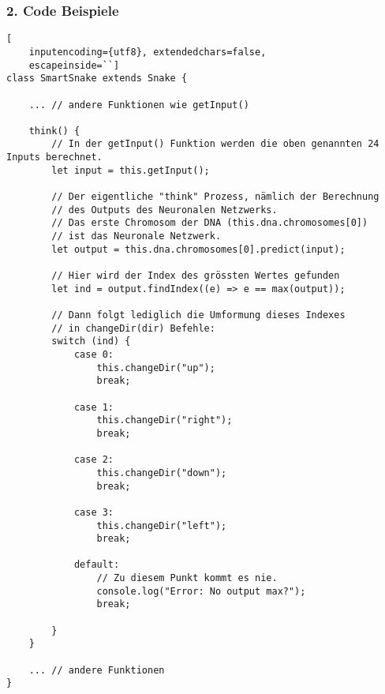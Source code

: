 \documentclass[11pt,a4paper,ngerman]{article}
\begin{document}
\subsubsection{2. Code Beispiele}

\begin{lstlisting}[
    inputencoding={utf8}, extendedchars=false,  
    escapeinside=``]
class SmartSnake extends Snake {

    ... // andere Funktionen wie getInput()

    think() {
        // In der getInput() Funktion werden die oben genannten 24 Inputs berechnet.
        let input = this.getInput(); 

        // Der eigentliche "think" Prozess, nämlich der Berechnung
        // des Outputs des Neuronalen Netzwerks.
        // Das erste Chromosom der DNA (this.dna.chromosomes[0])
        // ist das Neuronale Netzwerk.
        let output = this.dna.chromosomes[0].predict(input);       

        // Hier wird der Index des grössten Wertes gefunden
        let ind = output.findIndex((e) => e == max(output));

        // Dann folgt lediglich die Umformung dieses Indexes 
        // in changeDir(dir) Befehle:
        switch (ind) {
            case 0:
                this.changeDir("up");
                break;

            case 1:
                this.changeDir("right");
                break;

            case 2:
                this.changeDir("down");
                break;

            case 3:
                this.changeDir("left");
                break;

            default:
                // Zu diesem Punkt kommt es nie.
                console.log("Error: No output max?"); 
                break;

        }
    }
    
    ... // andere Funktionen
}
       
\end{lstlisting}
\end{document}
